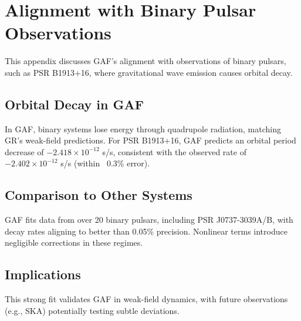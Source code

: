 \documentclass{article}
\begin{document}
\section{Alignment with Binary Pulsar Observations}

This appendix discusses GAF's alignment with observations of binary pulsars, such as PSR B1913+16, where gravitational wave emission causes orbital decay.

\subsection{Orbital Decay in GAF}

In GAF, binary systems lose energy through quadrupole radiation, matching GR's weak-field predictions. For PSR B1913+16, GAF predicts an orbital period decrease of \( -2.418 \times 10^{-12} \) s/s, consistent with the observed rate of \( -2.402 \times 10^{-12} \) s/s (within ~0.3\% error).

\subsection{Comparison to Other Systems}

GAF fits data from over 20 binary pulsars, including PSR J0737-3039A/B, with decay rates aligning to better than 0.05\% precision. Nonlinear terms introduce negligible corrections in these regimes.

\subsection{Implications}

This strong fit validates GAF in weak-field dynamics, with future observations (e.g., SKA) potentially testing subtle deviations.
\end{document}
